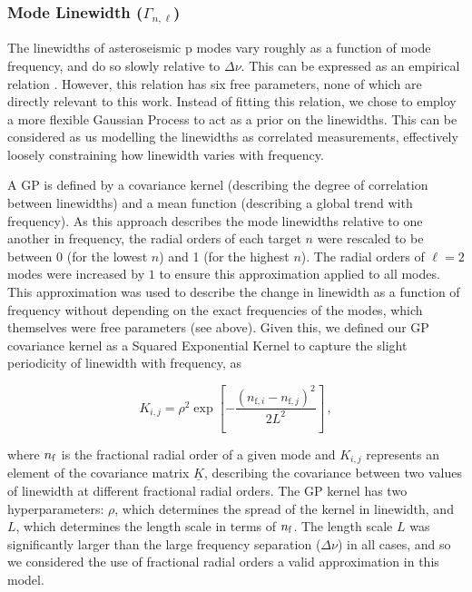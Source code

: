 \documentclass[12pt]{article}
\newcommand{\dnu}{\mbox{$\Delta \nu$}\xspace}
\begin{document}
\subsubsection{Mode Linewidth ($\Gamma_{n,\ell}$)}
The linewidths of asteroseismic p modes vary roughly as a function of mode frequency, and do so slowly relative to \dnu. This can be expressed as an empirical relation \cite{lund+2017, davies+2014, appourchaux+2016}. However, this relation has six free parameters, none of which are directly relevant to this work. Instead of fitting this relation, we chose to employ a more flexible Gaussian Process \cite[GP]{rasmussen+williams2006} to act as a prior on the linewidths. This can be considered as us modelling the linewidths as correlated measurements, effectively loosely constraining how linewidth varies with frequency.

A GP is defined by a covariance kernel (describing the degree of correlation between linewidths) and a mean function (describing a global trend with frequency). As this approach describes the mode linewidths relative to one another in frequency, the radial orders of each target $n$ were rescaled to be between 0 (for the lowest $n$) and 1 (for the highest $n$). The radial orders of $\ell = 2$ modes were increased by $1$ to ensure this approximation applied to all modes. This approximation was used to describe the change in linewidth as a function of frequency without depending on the exact frequencies of the modes, which themselves were free parameters (see above). Given this, we defined our GP covariance kernel as a Squared Exponential Kernel to capture the slight periodicity of linewidth with frequency, as

\begin{equation}\label{eq:gpkernel}
	K_{i,j} = \rho^2 \exp \left[ -\frac{(n_{\textrm{f}, i} - n_{\textrm{f}, j})^2}{2L^2} \right]\, ,
\end{equation}

\noindent where $n_{\rm f}$ is the fractional radial order of a given mode and  $K_{i,j}$ represents an element of the covariance matrix $\underline{K}$, describing the covariance between two values of linewidth at different fractional radial orders. The GP kernel has two hyperparameters: $\rho$, which determines the spread of the kernel in linewidth, and $L$, which determines the length scale in terms of $n_{\rm f}$. The length scale $L$ was significantly larger than the large frequency separation (\dnu) in all cases, and so we considered the use of fractional radial orders a valid approximation in this model.
\end{document}
